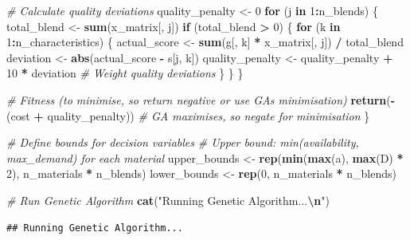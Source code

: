 \documentclass[
]{article}
\newenvironment{Shaded}{\begin{snugshade}}{\end{snugshade}}
\newcommand{\CommentTok}[1]{\textcolor[rgb]{0.56,0.35,0.01}{\textit{#1}}}
\newcommand{\ControlFlowTok}[1]{\textcolor[rgb]{0.13,0.29,0.53}{\textbf{#1}}}
\newcommand{\DecValTok}[1]{\textcolor[rgb]{0.00,0.00,0.81}{#1}}
\newcommand{\FunctionTok}[1]{\textcolor[rgb]{0.13,0.29,0.53}{\textbf{#1}}}
\newcommand{\NormalTok}[1]{#1}
\newcommand{\OtherTok}[1]{\textcolor[rgb]{0.56,0.35,0.01}{#1}}
\newcommand{\SpecialCharTok}[1]{\textcolor[rgb]{0.81,0.36,0.00}{\textbf{#1}}}
\newcommand{\StringTok}[1]{\textcolor[rgb]{0.31,0.60,0.02}{#1}}
\begin{document}
\begin{Shaded}
\begin{Highlighting}[]
  \CommentTok{\# Calculate quality deviations}
\NormalTok{  quality\_penalty }\OtherTok{\textless{}{-}} \DecValTok{0}
  \ControlFlowTok{for}\NormalTok{ (j }\ControlFlowTok{in} \DecValTok{1}\SpecialCharTok{:}\NormalTok{n\_blends) \{}
\NormalTok{    total\_blend }\OtherTok{\textless{}{-}} \FunctionTok{sum}\NormalTok{(x\_matrix[, j])}
    \ControlFlowTok{if}\NormalTok{ (total\_blend }\SpecialCharTok{\textgreater{}} \DecValTok{0}\NormalTok{) \{}
      \ControlFlowTok{for}\NormalTok{ (k }\ControlFlowTok{in} \DecValTok{1}\SpecialCharTok{:}\NormalTok{n\_characteristics) \{}
\NormalTok{        actual\_score }\OtherTok{\textless{}{-}} \FunctionTok{sum}\NormalTok{(g[, k] }\SpecialCharTok{*}\NormalTok{ x\_matrix[, j]) }\SpecialCharTok{/}\NormalTok{ total\_blend}
\NormalTok{        deviation }\OtherTok{\textless{}{-}} \FunctionTok{abs}\NormalTok{(actual\_score }\SpecialCharTok{{-}}\NormalTok{ s[j, k])}
\NormalTok{        quality\_penalty }\OtherTok{\textless{}{-}}\NormalTok{ quality\_penalty }\SpecialCharTok{+} \DecValTok{10} \SpecialCharTok{*}\NormalTok{ deviation  }\CommentTok{\# Weight quality deviations}
\NormalTok{      \}}
\NormalTok{    \}}
\NormalTok{  \}}
  
  \CommentTok{\# Fitness (to minimise, so return negative or use GA\textquotesingle{}s minimisation)}
  \FunctionTok{return}\NormalTok{(}\SpecialCharTok{{-}}\NormalTok{(cost }\SpecialCharTok{+}\NormalTok{ quality\_penalty))  }\CommentTok{\# GA maximises, so negate for minimisation}
\NormalTok{\}}

\CommentTok{\# Define bounds for decision variables}
\CommentTok{\# Upper bound: min(availability, max\_demand) for each material}
\NormalTok{upper\_bounds }\OtherTok{\textless{}{-}} \FunctionTok{rep}\NormalTok{(}\FunctionTok{min}\NormalTok{(}\FunctionTok{max}\NormalTok{(a), }\FunctionTok{max}\NormalTok{(D) }\SpecialCharTok{*} \DecValTok{2}\NormalTok{), n\_materials }\SpecialCharTok{*}\NormalTok{ n\_blends)}
\NormalTok{lower\_bounds }\OtherTok{\textless{}{-}} \FunctionTok{rep}\NormalTok{(}\DecValTok{0}\NormalTok{, n\_materials }\SpecialCharTok{*}\NormalTok{ n\_blends)}

\CommentTok{\# Run Genetic Algorithm}
\FunctionTok{cat}\NormalTok{(}\StringTok{"Running Genetic Algorithm...}\SpecialCharTok{\textbackslash{}n}\StringTok{"}\NormalTok{)}
\end{Highlighting}
\end{Shaded}

\begin{verbatim}
## Running Genetic Algorithm...
\end{verbatim}
\end{document}
